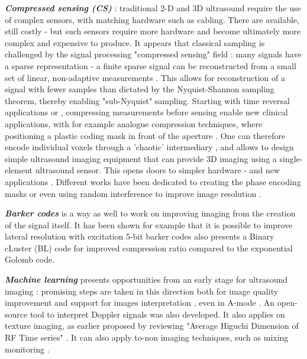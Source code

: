 \documentclass{article}
\begin{document}
\textbf{\textit{Compressed sensing (CS)}} : traditional 2-D and 3D ultrasound require the use of complex sensors, with matching hardware such as cabling. There are available, still costly - but such sensors require more hardware and become ultimately more complex and expensive to produce. 
It appears that classical sampling is challenged by the signal processing "compressed sensing" field \cite{liutkus_imaging_2014}: many signals have a sparse representation - a finite sparse signal can be reconstructed from a small set of linear, non-adaptive measurements \cite{hua_compressed_2011}. This allows for reconstruction of a signal with fewer samples than dictated by the Nyquist-Shannon sampling theorem, thereby enabling "sub-Nyquist" sampling. Starting with time reversal applications \cite{montaldo_time_2004,montaldo_building_2005} or \cite{sarvazyan_comparative_2009}, compressing measurements before sensing enable new clinical applications, with for example analogue compression techniques, where positioning a plastic coding mask in front of the aperture \cite{fedjajevs_ultrasound_2016}.  One can therefore encode individual voxels through a 'chaotic' intermediary \cite{luong_compact_2016}, and allows to design simple ultrasound imaging equipment that can provide 3D imaging using a single-element ultrasound sensor. This opens doors to simpler hardware - and new applications \cite{kruizinga_compressive_2017}. Different works have been dedicated to creating the phase encoding masks \cite{van_der_meulen_spatial_2017} or even using random interference to improve image resolution \cite{ni_high-resolution_2020}.

\textbf{\textit{Barker codes}} is a way as well to work on improving imaging from the creation of the signal itself. It has been shown for example that it is possible to improve lateral resolution with excitation 5-bit barker codes \cite{fujita_effect_2017,chun_ultrasound_2015,kim_real-time_2018} also presents a Binary cLuster (BL) code for improved compression ratio compared to the exponential Golomb code.

\textbf{\textit{Machine learning}} presents opportunities from an early stage for ultrasound imaging : promising steps are taken in this direction both for image quality improvement \cite{wang_high-resolution_2019, hewener_mobile_2019} and support for images interpretation \cite{divya_krishna_computer_2016}, even in A-mode \cite{brausch_classifying_2019}. An open-source tool to interpret Doppler signals \cite{dhutia_open-source_2017} was also developed. It also applies on texture imaging, as earlier proposed by reviewing "Average Higuchi Dimension of RF Time series" \cite{moradi_detection_2006}. It can also apply to-non imaging techniques, such as mixing monitoring \cite{bowler_monitoring_2020}.
\end{document}
